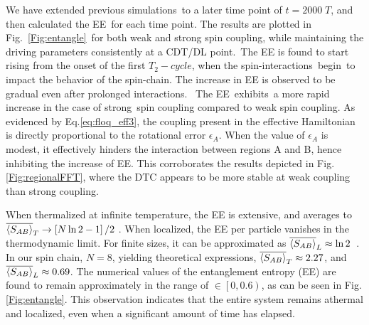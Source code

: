 \documentclass[
nofootinbib,
reprint,
superscriptaddress,
amsmath,amssymb,showkeys,
aps,
prb,
]{revtex4-2}
\begin{document}
	We have extended previous simulations to a later time point of $t=2000\;T$, and then calculated the EE for each time point. The results are plotted in Fig.~\ref{Fig:entangle} for both weak and strong spin coupling, while maintaining the driving parameters consistently at a CDT/DL point. The EE is found to start rising from the onset of the first $T_2-cycle$, when the spin-interactions begin to impact the behavior of the spin-chain. The increase in EE is observed to be gradual even after prolonged interactions.  The EE exhibits a more rapid increase in the case of strong spin coupling compared to weak spin coupling. As evidenced by Eq.\eqref{eq:floq_eff3}, the coupling present in the effective Hamiltonian is directly proportional to the rotational error $\epsilon_A$. When the value of $\epsilon_A$ is modest, it effectively hinders the interaction between regions A and B, hence inhibiting the increase of EE. {This corroborates the results depicted in Fig.\ref{Fig:regionalFFT}, where the DTC appears to be more stable at weak coupling than strong coupling.} 
	
	
	When thermalized at infinite temperature, the EE is extensive, and averages to $\displaystyle \overline{\expval{S_{AB}}}_T\rightarrow \left[N \ln{2}-1\right]/2$ \cite{Lu2021}. When localized, the EE per particle vanishes in the thermodynamic limit. For finite sizes, it can be approximated as $\overline{\expval{S_{AB}}}_L\approx \ln{2}$~\cite{sakurai_phys_nodate}. 
	{In our spin chain, $N=8$, yielding theoretical expressions, $\overline{\expval{S_{AB}}}_T\approx 2.27$, and  $\overline{\expval{S_{AB}}}_L\approx 0.69$. The numerical values of the entanglement entropy (EE) are found to remain approximately in the range of $\in\left[0,0.6\right)$, as can be seen in Fig.\ref{Fig:entangle}. This observation indicates that the entire system remains athermal and localized, even when a significant amount of time has elapsed.}
	
\end{document}
